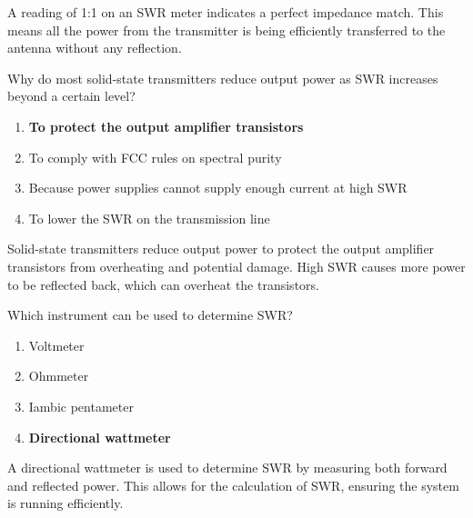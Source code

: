 A reading of 1:1 on an SWR meter indicates a perfect impedance match. This means all the power from the transmitter is being efficiently transferred to the antenna without any reflection.

\begin{tcolorbox}[colback=gray!10!white,colframe=black!75!black,title={T7C05}]
    Why do most solid-state transmitters reduce output power as SWR increases beyond a certain level?
    \begin{enumerate}[label=\Alph*),noitemsep]
        \item \textbf{To protect the output amplifier transistors}
        \item To comply with FCC rules on spectral purity
        \item Because power supplies cannot supply enough current at high SWR
        \item To lower the SWR on the transmission line
    \end{enumerate}
\end{tcolorbox}

Solid-state transmitters reduce output power to protect the output amplifier transistors from overheating and potential damage. High SWR causes more power to be reflected back, which can overheat the transistors.

\begin{tcolorbox}[colback=gray!10!white,colframe=black!75!black,title={T7C08}]
    Which instrument can be used to determine SWR?
    \begin{enumerate}[label=\Alph*),noitemsep]
        \item Voltmeter
        \item Ohmmeter
        \item Iambic pentameter
        \item \textbf{Directional wattmeter}
    \end{enumerate}
\end{tcolorbox}

A directional wattmeter is used to determine SWR by measuring both forward and reflected power. This allows for the calculation of SWR, ensuring the system is running efficiently.

